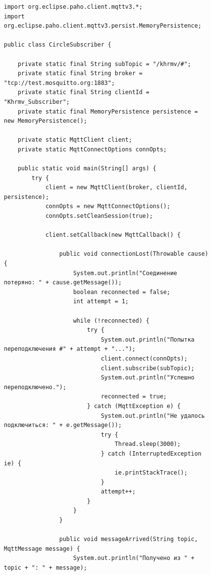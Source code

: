 \documentclass[a4paper, 14pt]{extarticle}
\begin{document}
\begin{figure}[!htb]
\begin{lstlisting}[language={},caption={Консольная реализация},label={lst:code2}]
import org.eclipse.paho.client.mqttv3.*;
import org.eclipse.paho.client.mqttv3.persist.MemoryPersistence;

public class CircleSubscriber {

    private static final String subTopic = "/khrmv/#";
    private static final String broker = "tcp://test.mosquitto.org:1883";
    private static final String clientId = "Khrmv_Subscriber";
    private static final MemoryPersistence persistence = new MemoryPersistence();

    private static MqttClient client;
    private static MqttConnectOptions connOpts;

    public static void main(String[] args) {
        try {
            client = new MqttClient(broker, clientId, persistence);
            connOpts = new MqttConnectOptions();
            connOpts.setCleanSession(true);

            client.setCallback(new MqttCallback() {

                public void connectionLost(Throwable cause) {
                    System.out.println("Соединение потеряно: " + cause.getMessage());
                    boolean reconnected = false;
                    int attempt = 1;

                    while (!reconnected) {
                        try {
                            System.out.println("Попытка переподключения #" + attempt + "...");
                            client.connect(connOpts);
                            client.subscribe(subTopic);
                            System.out.println("Успешно переподключено.");
                            reconnected = true;
                        } catch (MqttException e) {
                            System.out.println("Не удалось подключиться: " + e.getMessage());
                            try {
                                Thread.sleep(3000);
                            } catch (InterruptedException ie) {
                                ie.printStackTrace();
                            }
                            attempt++;
                        }
                    }
                }

                public void messageArrived(String topic, MqttMessage message) {
                    System.out.println("Получено из " + topic + ": " + message);


\end{lstlisting}
\end{figure}
\end{document}
